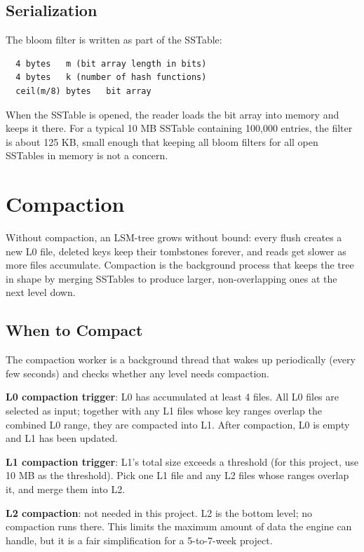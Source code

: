 \documentclass[11pt,a4paper]{article}
\begin{document}
\subsection{Serialization}
The bloom filter is written as part of the SSTable:

\begin{codebox}
\begin{lstlisting}
  4 bytes   m (bit array length in bits)
  4 bytes   k (number of hash functions)
  ceil(m/8) bytes   bit array
\end{lstlisting}
\end{codebox}

When the SSTable is opened, the reader loads the bit array into memory and keeps it there. For a typical 10 MB SSTable containing 100{,}000 entries, the filter is about 125 KB, small enough that keeping all bloom filters for all open SSTables in memory is not a concern.

\section{Compaction}

Without compaction, an LSM-tree grows without bound: every flush creates a new L0 file, deleted keys keep their tombstones forever, and reads get slower as more files accumulate. Compaction is the background process that keeps the tree in shape by merging SSTables to produce larger, non-overlapping ones at the next level down.

\subsection{When to Compact}
The compaction worker is a background thread that wakes up periodically (every few seconds) and checks whether any level needs compaction.

\textbf{L0 compaction trigger}: L0 has accumulated at least 4 files. All L0 files are selected as input; together with any L1 files whose key ranges overlap the combined L0 range, they are compacted into L1. After compaction, L0 is empty and L1 has been updated.

\textbf{L1 compaction trigger}: L1's total size exceeds a threshold (for this project, use 10 MB as the threshold). Pick one L1 file and any L2 files whose ranges overlap it, and merge them into L2.

\textbf{L2 compaction}: not needed in this project. L2 is the bottom level; no compaction runs there. This limits the maximum amount of data the engine can handle, but it is a fair simplification for a 5-to-7-week project.
\end{document}
